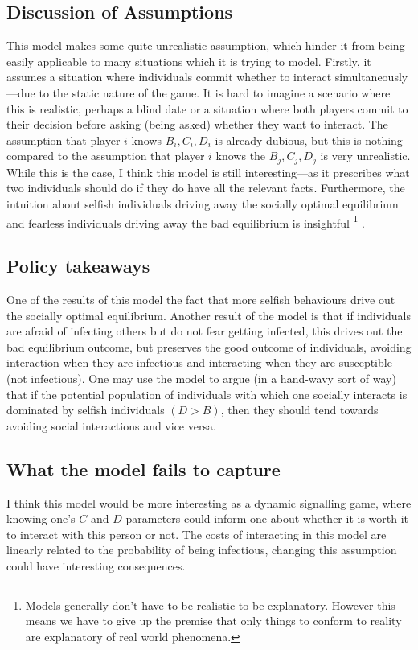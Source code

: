 \documentclass{article}
\theoremstyle{definition}
\theoremstyle{exercise}
\theoremstyle{remark}
\begin{document}
\subsection*{Discussion of Assumptions}

This model makes some quite unrealistic assumption, which hinder it from being easily applicable to many situations which it is trying to model.
Firstly, it assumes a situation where individuals commit whether to interact simultaneously---due to the static nature of the game.
It is hard to imagine a scenario where this is realistic, perhaps a blind date or a situation where both players commit to their decision before asking (being asked) whether they want to interact.
The assumption that player $i$ knows $B_i, C_i, D_i$ is already dubious, but this is nothing compared to the assumption that player $i$ knows the $B_j, C_j, D_j$ is very unrealistic.
While this is the case, I think this model is still interesting---as it prescribes what two individuals should do if they do have all the relevant facts. Furthermore, the intuition about selfish individuals driving away the socially optimal equilibrium and fearless individuals driving away the bad equilibrium is insightful%
\footnote{Models generally don't have to be realistic to be explanatory. However this means we have to give up the premise that only things to conform to reality are explanatory of real world phenomena.}%
. 


\subsection*{Policy takeaways}
One of the results of this model the fact that more selfish behaviours drive out the socially optimal equilibrium.
Another result of the model is that if individuals are afraid of infecting others but do not fear getting infected, this drives out the bad equilibrium outcome, but preserves the good outcome of individuals, avoiding interaction when they are infectious and interacting when they are susceptible (not infectious).
One may use the model to argue (in a hand-wavy sort of way) that if the potential population of individuals with which one socially interacts is dominated by selfish individuals $(D > B)$, then they should tend towards avoiding social interactions and vice versa.

\subsection*{What the model fails to capture}
I think this model would be more interesting as a dynamic signalling game, where knowing one's $C$ and $D$ parameters could inform one about whether it is worth it to interact with this person or not. 
The costs of interacting in this model are linearly related to the probability of being infectious, changing this assumption could have interesting consequences.
\end{document}
